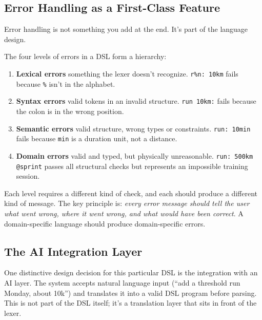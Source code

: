 \subsection{Error Handling as a First-Class Feature}

Error handling is not something you add at the end. It's part of the language design.

The four levels of errors in a DSL form a hierarchy:

\begin{enumerate}
  \item \textbf{Lexical errors} something the lexer doesn't recognize.
    \texttt{r\%n: 10km} fails because \texttt{\%} isn't in the alphabet.
  \item \textbf{Syntax errors} valid tokens in an invalid structure.
    \texttt{run 10km:} fails because the colon is in the wrong position.
  \item \textbf{Semantic errors} valid structure, wrong types or constraints.
    \texttt{run: 10min} fails because \texttt{min} is a duration unit, not a distance.
  \item \textbf{Domain errors} valid and typed, but physically unreasonable.
    \texttt{run: 500km @sprint} passes all structural checks but represents an impossible
    training session.
\end{enumerate}

Each level requires a different kind of check, and each should produce a different kind
of message. The key principle is: \emph{every error message should tell the user what
went wrong, where it went wrong, and what would have been correct}. A domain-specific
language should produce domain-specific errors.

\subsection{The AI Integration Layer}

One distinctive design decision for this particular DSL is the integration with an AI
layer. The system accepts natural language input (``add a threshold run Monday, about
10k'') and translates it into a valid DSL program before parsing. This is not part of
the DSL itself; it's a translation layer that sits in front of the lexer.

